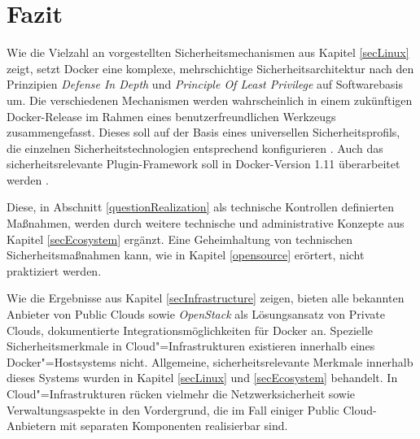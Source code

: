 \documentclass[../main.tex]{subfiles}
\begin{document}
\chapter{Fazit}
\label{result}

  Wie die Vielzahl an vorgestellten Sicherheitsmechanismen aus Kapitel \ref{secLinux} zeigt, setzt Docker eine komplexe, mehrschichtige Sicherheitsarchitektur nach den Prinzipien \emph{Defense In Depth} und \emph{Principle Of Least Privilege} auf Softwarebasis um. Die verschiedenen Mechanismen werden wahrscheinlich in einem zukünftigen Docker-Release im Rahmen eines benutzerfreundlichen Werkzeugs zusammengefasst. Dieses soll auf der Basis eines universellen Sicherheitsprofils, die einzelnen Sicherheitstechnologien entsprechend konfigurieren \cite{githubGeneralSecProfiles}. Auch das sicherheitsrelevante Plugin-Framework soll in Docker-Version 1.11 überarbeitet werden \cite{githubDockerRoadmap}\cite{githubAuthZPluginInfrastructure}.

  Diese, in Abschnitt \ref{questionRealization} als technische Kontrollen definierten Maßnahmen, werden durch weitere technische und administrative Konzepte aus Kapitel \ref{secEcosystem} ergänzt. Eine Geheimhaltung von technischen Sicherheitsmaßnahmen kann, wie in Kapitel \ref{opensource} erörtert, nicht praktiziert werden.

  Wie die Ergebnisse aus Kapitel \ref{secInfrastructure} zeigen, bieten alle bekannten Anbieter von Public Clouds sowie \emph{OpenStack} als Lösungsansatz von Private Clouds, dokumentierte Integrationsmöglichkeiten für Docker an. Spezielle Sicherheitsmerkmale in Cloud"=Infrastrukturen existieren innerhalb eines Docker"=Hostsystems nicht. Allgemeine, sicherheitsrelevante Merkmale innerhalb dieses Systems wurden in Kapitel \ref{secLinux} und \ref{secEcosystem} behandelt. In Cloud"=Infrastrukturen rücken vielmehr die Netzwerksicherheit sowie Verwaltungsaspekte in den Vordergrund, die im Fall einiger Public Cloud-Anbietern mit separaten Komponenten realisierbar sind.
\end{document}
